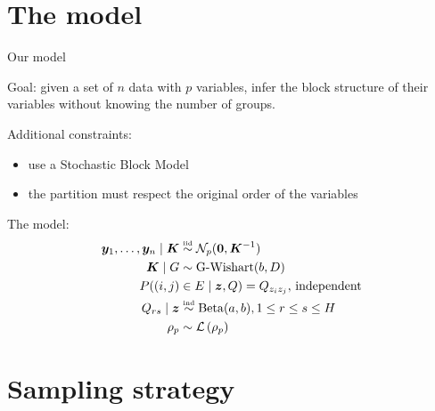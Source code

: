 
\section{The model}


\begin{frame}{Our model}

\alert{Goal}: given a set of $n$ data with $p$ variables, infer the block structure of their variables
without knowing the number of groups.

\pause

\alert{Additional constraints}: 
\begin{itemize}
    \item use a Stochastic Block Model    
    \item the partition must respect the original order of the variables
\end{itemize} 

\pause

\alert{The model}: 
\begin{align*}
    \bm{y}_1, \ldots, \bm{y}_n \mid \bm{K} & \overset{\text{\tiny{iid}}}{\sim} \mathcal{N}_p(\mathbf{0}, \bm{K}^{-1} ) \\
    \bm{K} \mid G & \sim \operatorname{G-Wishart}(b, D)\\
    P((i,j)&\in E\mid \bm{z},Q) = Q_{z_{i} z_{j}},\,\text{independent}\\
        Q_{rs} \mid \bm{z} &\overset{\text{\tiny{ind}}}{\sim} \operatorname{Beta}(a,b), 1\leq r\leq s\leq H\\
    \rho_p & \sim \mathcal{L}\left(\rho_p\right)
\end{align*}


\end{frame}


\section{Sampling strategy}

